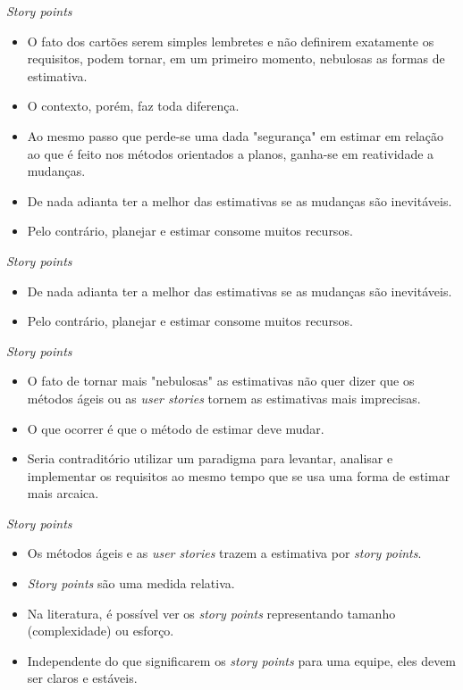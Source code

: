 \documentclass[11pt]{beamer}
\begin{document}
    \begin{frame}{\textit{Story points}}
        \begin{itemize}
            \item O fato dos cartões serem simples lembretes e não definirem exatamente os requisitos, podem tornar, em um primeiro momento, nebulosas as formas de estimativa.
            \item O contexto, porém, faz toda diferença.
            \item Ao mesmo passo que perde-se uma dada "segurança" em estimar em relação ao que é feito nos métodos orientados a planos, ganha-se em reatividade a mudanças.
            \item De nada adianta ter a melhor das estimativas se as mudanças são inevitáveis.
            \item Pelo contrário, planejar e estimar consome muitos recursos.
        \end{itemize}
    \end{frame}

    \begin{frame}{\textit{Story points}}
        \begin{itemize}
            \item De nada adianta ter a melhor das estimativas se as mudanças são inevitáveis.
            \item Pelo contrário, planejar e estimar consome muitos recursos.
        \end{itemize}
    \end{frame}

    \begin{frame}{\textit{Story points}}
        \begin{itemize}
            \item O fato de tornar mais "nebulosas" as estimativas não quer dizer que os métodos ágeis ou as \textit{user stories} tornem as estimativas mais imprecisas.
            \item O que ocorrer é que o método de estimar deve mudar.
            \item Seria contraditório utilizar um paradigma para levantar, analisar e implementar os requisitos ao mesmo tempo que se usa uma forma de estimar mais arcaica. 
        \end{itemize}
    \end{frame}

    \begin{frame}{\textit{Story points}}
        \begin{itemize}
            \item Os métodos ágeis e as \textit{user stories} trazem a estimativa por \textit{story points}.
            \item \textit{Story points} são uma medida relativa.
            \item Na literatura, é possível ver os \textit{story points} representando tamanho (complexidade) ou esforço.
            \item Independente do que significarem os \textit{story points} para uma equipe, eles devem ser claros e estáveis.
        \end{itemize}
    \end{frame}
\end{document}
